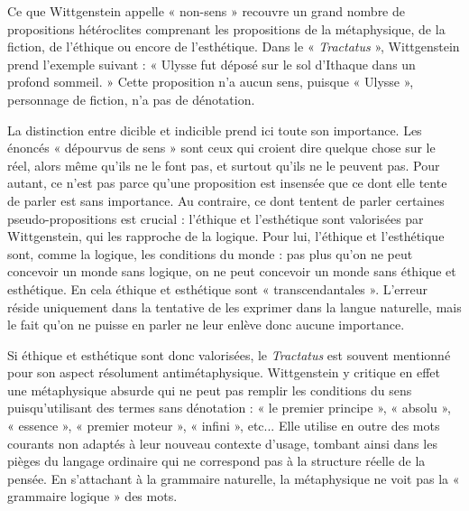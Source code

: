 Ce que Wittgenstein appelle « non-sens » recouvre un grand nombre de propositions hétéroclites comprenant les propositions de la métaphysique, de la fiction, de l’éthique ou encore de l’esthétique. Dans le « \textit{Tractatus} », Wittgenstein prend l’exemple suivant : « Ulysse fut déposé sur le sol d’Ithaque dans un profond sommeil. » Cette proposition n’a aucun sens, puisque « Ulysse », personnage de fiction, n’a pas de dénotation.

La distinction entre dicible et indicible prend ici toute son importance. Les énoncés « dépourvus de sens » sont ceux qui croient dire quelque chose sur le réel, alors même qu’ils ne le font pas, et surtout qu’ils ne le peuvent pas. Pour autant, ce n’est pas parce qu’une proposition est insensée que ce dont elle tente de parler est sans importance. Au contraire, ce dont tentent de parler certaines pseudo-propositions est crucial : l’éthique et l’esthétique sont valorisées par Wittgenstein, qui les rapproche de la logique. Pour lui, l’éthique et l’esthétique sont, comme la logique, les conditions du monde : pas plus qu’on ne peut concevoir un monde sans logique, on ne peut concevoir un monde sans éthique et esthétique. En cela éthique et esthétique sont « transcendantales ». L’erreur réside uniquement dans la tentative de les exprimer dans la langue naturelle, mais le fait qu’on ne puisse en parler ne leur enlève donc aucune importance.

Si éthique et esthétique sont donc valorisées, le \textit{Tractatus} est souvent mentionné pour son aspect résolument antimétaphysique. Wittgenstein y critique en effet une métaphysique absurde qui ne peut pas remplir les conditions du sens puisqu’utilisant des termes sans dénotation : « le premier principe », « absolu », « essence », « premier moteur », « infini », etc... Elle utilise en outre des mots courants non adaptés à leur nouveau contexte d’usage, tombant ainsi dans les pièges du langage ordinaire qui ne correspond pas à la structure réelle de la pensée. En s’attachant à la grammaire naturelle, la métaphysique ne voit pas la « grammaire logique » des mots.

